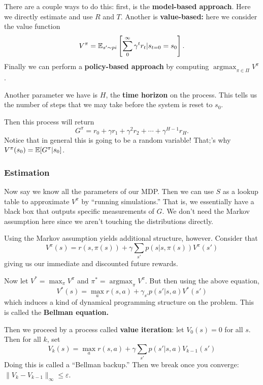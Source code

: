 \documentclass[12pt]{article}
\DeclareMathOperator*{\argmax}{argmax}
\begin{document}
There are a couple ways to do this: first, is the \textbf{model-based approach}. Here we directly estimate and use $R$ and $T$. Another is \textbf{value-based:}
here we consider the value function 
\[V^\pi=\mathbb{E}_{s'\sim pi}\left[\sum_0^\infty\gamma^tr_t|s_{t=0}=s_0\right].\]
Finally we can perform a \textbf{policy-based approach} by computing $\argmax_{\pi\in\Pi}V^\pi$.

Another parameter we have is $H$, the \textbf{time horizon} on the process. This tells us the number of steps that we may take before the system is reset to $s_0$.

Then this process will return
\[G^\pi=r_{0}+\gamma r_{1}+\gamma^2r_2+\cdots+\gamma^{H-1}r_H.\]
Notice that in general this is going to be a random variable! That;'s why $V^\pi(s_0)=\mathbb{E}[G^\pi|s_0]$.

\subsubsection{Estimation}
Now say we know all the parameters of our MDP. Then we can use $S$ as a lookup table to approximate $V^\pi$ by ``running simulations.'' That is, we essentially 
have a black box that outputs specific measurements of $G$. We don't need the Markov assumption here since we aren't touching the distributions directly.

Using the Markov assumption yields additional structure, however. Consider that 
\[V^\pi(s)= r(s,\pi(s))+\gamma\sum_{s'}p(s|s,\pi(s))V^\pi(s')\]
giving us our immediate and discounted future rewards.

Now let $V^\ast=\max_{\pi}V^\pi$ and $\pi^\ast=\argmax_\pi V^\pi$. But then using the above equation,
\[V^\ast(s)=\max_a r(s,a)+\gamma_{s'}p(s'|s,a)V^\ast(s')\]
which induces a kind of dynamical programming structure on the problem. This is called the \textbf{Bellman equation.}

Then we proceed by a process called \textbf{value iteration}: let $V_0(s)=0$ for all $s$. Then for all $k$, set 
\[V_k(s)=\max_a r(s,a)+\gamma\sum_{s'}p(s'|s,a)V_{k-1}(s')\]
Doing this is called a ``Bellman backup.'' Then we break once you converge: $\|V_k-V_{k-1}\|_\infty\le\varepsilon$.
\end{document}
